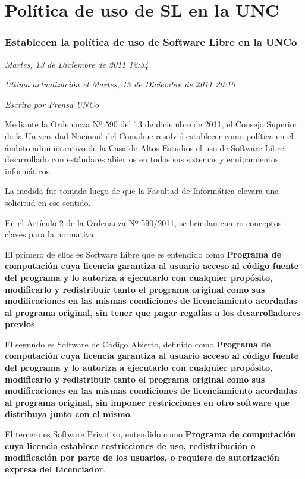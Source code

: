 {\section {Política de uso de SL en la UNC}

\subsubsection{Establecen la política de uso de Software Libre en la UNCo}

\emph {Martes, 13 de Diciembre de 2011 12:34}

\emph {Última actualización el Martes, 13 de Diciembre de 2011 20:10 }

 \emph {Escrito por Prensa UNCo}

Mediante la Ordenanza Nº 590 del 13 de diciembre de 2011, el Consejo Superior de la Universidad Nacional del Comahue resolvió establecer como política en el ámbito administrativo de la Casa de Altos Estudios el uso de Software Libre desarrollado con estándares abiertos en todos sus sistemas y equipamientos informáticos.

La medida fue tomada luego de que la Facultad de Informática elevara una solicitud en ese sentido.

 


En el Artículo 2 de la Ordenanza Nº 590/2011, se brindan cuatro conceptos claves para la normativa.

El primero de ellos es Software Libre que es entendido como \textbf{Programa de computación cuya licencia garantiza al usuario acceso al código fuente del programa y lo autoriza a ejecutarlo con cualquier propósito, modificarlo y redistribuir tanto el programa original como sus modificaciones en las mismas condiciones de licenciamiento acordadas al programa original, sin tener que pagar regalías a los desarrolladores previos}.

El segundo es Software de Código Abierto, definido como \textbf{Programa de computación cuya licencia garantiza al usuario acceso al código fuente del programa y lo autoriza a ejecutarlo con cualquier propósito, modificarlo y redistribuir tanto el programa original como sus modificaciones en las mismas condiciones de licenciamiento acordadas al programa original, sin imponer restricciones en otro software que distribuya junto con el mismo}.

El tercero es Software Privativo, entendido como \textbf{Programa de computación cuya licencia establece restricciones de uso, redistribución o modificación por parte de los usuarios, o requiere de autorización expresa del Licenciador}.

}
